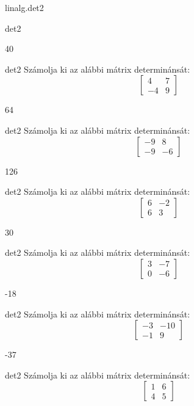 \documentclass[12pt]{article}
\begin{document}
\begin{quiz}{linalg.det2}
\begin{numerical}{det2}
\item 40
\end{numerical}


\begin{numerical}{det2}
Számolja ki az alábbi mátrix determinánsát:
$$\left[\begin{array}{cc}4& 7\\ -4& 9\end{array}\right]$$

\item 64
\end{numerical}


\begin{numerical}{det2}
Számolja ki az alábbi mátrix determinánsát:
$$\left[\begin{array}{cc}-9& 8\\ -9& -6\end{array}\right]$$

\item 126
\end{numerical}


\begin{numerical}{det2}
Számolja ki az alábbi mátrix determinánsát:
$$\left[\begin{array}{cc}6& -2\\ 6& 3\end{array}\right]$$

\item 30
\end{numerical}


\begin{numerical}{det2}
Számolja ki az alábbi mátrix determinánsát:
$$\left[\begin{array}{cc}3& -7\\ 0& -6\end{array}\right]$$

\item -18
\end{numerical}


\begin{numerical}{det2}
Számolja ki az alábbi mátrix determinánsát:
$$\left[\begin{array}{cc}-3& -10\\ -1& 9\end{array}\right]$$

\item -37
\end{numerical}


\begin{numerical}{det2}
Számolja ki az alábbi mátrix determinánsát:
$$\left[\begin{array}{cc}1& 6\\ 4& 5\end{array}\right]$$


\end{numerical}
\end{quiz}
\end{document}
